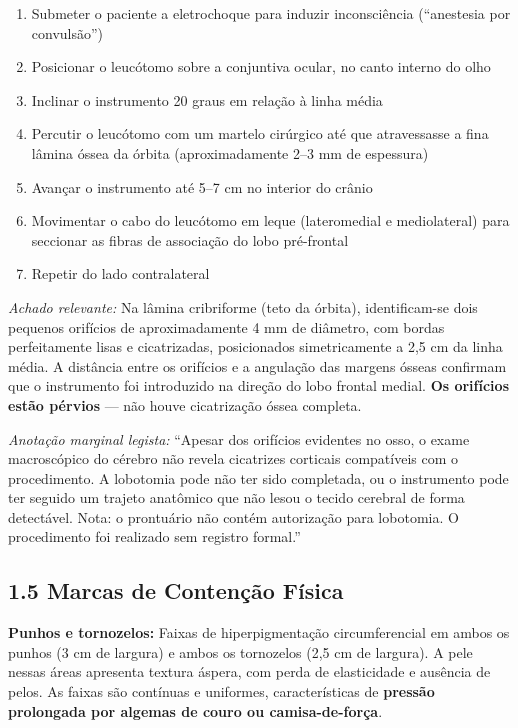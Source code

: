 \begin{enumerate}
    \item Submeter o paciente a eletrochoque para induzir inconsciência (``anestesia por convulsão'')
    \item Posicionar o leucótomo sobre a conjuntiva ocular, no canto interno do olho
    \item Inclinar o instrumento 20 graus em relação à linha média
    \item Percutir o leucótomo com um martelo cirúrgico até que atravessasse a fina lâmina óssea da órbita (aproximadamente 2–3 mm de espessura)
    \item Avançar o instrumento até 5–7 cm no interior do crânio
    \item Movimentar o cabo do leucótomo em leque (lateromedial e mediolateral) para seccionar as fibras de associação do lobo pré-frontal
    \item Repetir do lado contralateral
\end{enumerate}

\textit{Achado relevante:} Na lâmina cribriforme (teto da órbita), identificam-se dois pequenos orifícios de aproximadamente 4 mm de diâmetro, com bordas perfeitamente lisas e cicatrizadas, posicionados simetricamente a 2,5 cm da linha média. A distância entre os orifícios e a angulação das margens ósseas confirmam que o instrumento foi introduzido na direção do lobo frontal medial. \textbf{Os orifícios estão pérvios} --- não houve cicatrização óssea completa.

\textit{Anotação marginal legista:} ``Apesar dos orifícios evidentes no osso, o exame macroscópico do cérebro não revela cicatrizes corticais compatíveis com o procedimento. A lobotomia pode não ter sido completada, ou o instrumento pode ter seguido um trajeto anatômico que não lesou o tecido cerebral de forma detectável. Nota: o prontuário não contém autorização para lobotomia. O procedimento foi realizado sem registro formal.''

\subsection*{1.5 Marcas de Contenção Física}

\textbf{Punhos e tornozelos:} Faixas de hiperpigmentação circumferencial em ambos os punhos (3 cm de largura) e ambos os tornozelos (2,5 cm de largura). A pele nessas áreas apresenta textura áspera, com perda de elasticidade e ausência de pelos. As faixas são contínuas e uniformes, características de \textbf{pressão prolongada por algemas de couro ou camisa-de-força}.

